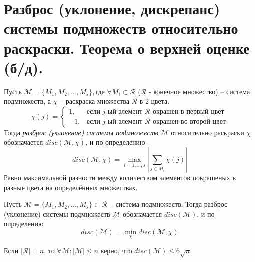 \setcounter{section}{17}
\section{Разброс (уклонение, дискрепанс) системы подмножеств относительно раскраски. Теорема о верхней оценке (б/д).}
\begin{definition} Пусть $\mathcal{M} = \{M_1, M_2, ..., M_s\}, \text{где } \forall M_i \subset \mathcal{R}$ ($\mathcal{R}$ - конечное множество) -- система подмножеств, а $\chi$ -- раскраска множества $\mathcal{R}$ в 2 цвета.
\begin{equation*}
    \chi (j) = 
    \begin{cases}
        1, &\text{если $j$-ый элемент $\mathcal{R}$ окрашен в первый цвет}\\
        -1, &\text{если $j$-ый элемент $\mathcal{R}$ окрашен во второй цвет}
    \end{cases}
\end{equation*}
Тогда \textit{разброс (уклонение) системы подмножеств} $\mathcal{M}$ относительно раскраски $\chi$ обозначается $disc(\mathcal{M}, \chi)$, и по определению
$$disc(\mathcal{M}, \chi) = \max_{i=1,...,s}|\sum_{j \in M_i} \chi(j)|$$
Равно максимальной разности между количеством элементов покрашеных в разные цвета на определённых множествах. 
\end{definition}
\begin{definition} Пусть $\mathcal{M} = \{M_1, M_2, ..., M_s\} \subset \mathcal{R}$ -- система подмножеств. Тогда разброс (уклонение) системы подмножеств $\mathcal{M}$ обозначается $disc(\mathcal{M})$, и по определению
$$disc(\mathcal{M}) = \min_{\chi} disc(\mathcal{M}, \chi)$$
\end{definition}
\begin{theorem}
Если $|\mathcal{R}| = n$, то $\forall \mathcal{M} : |\mathcal{M}| \leq n$ верно, что $disc(\mathcal{M}) \leq 6\sqrt{n}$
\end{theorem}


